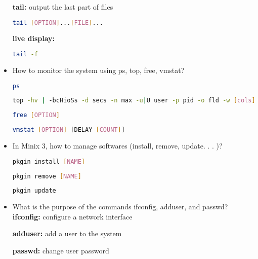 \documentclass{article}
\begin{document}
\begin{itemize}
\textbf{tail:} output the last part of files
\begin{lstlisting}[language=bash]
tail [OPTION]...[FILE]...
\end{lstlisting}
\textbf{live display:}
\begin{lstlisting}[language=bash]
tail -f
\end{lstlisting}
\item How to monitor the system using ps, top, free, vmstat?\\
\begin{lstlisting}[language=bash]
ps
\end{lstlisting}
\begin{lstlisting}[language=bash]
top -hv | -bcHioSs -d secs -n max -u|U user -p pid -o fld -w [cols]
\end{lstlisting}
\begin{lstlisting}[language=bash]
free [OPTION]
\end{lstlisting}
\begin{lstlisting}[language=bash]
vmstat [OPTION] [DELAY [COUNT]]
\end{lstlisting}
\item In Minix 3, how to manage softwares (install, remove, update. . . )?\\
\begin{lstlisting}[language=bash]
pkgin install [NAME]
\end{lstlisting}
\begin{lstlisting}[language=bash]
pkgin remove [NAME]
\end{lstlisting}
\begin{lstlisting}[language=bash]
pkgin update
\end{lstlisting}
\item What is the purpose of the commands ifconfig, adduser, and passwd?\\
\textbf{ifconfig:} configure a network interface

\textbf{adduser:} add a user to the system

\textbf{passwd:} change user password
\end{itemize}
\end{document}
